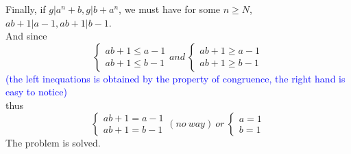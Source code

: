 \documentclass{Math_Note}
\begin{document}
\begin{sol}
Finally, if $g\vert a^{n}+b, g\vert b+a^{n}$, we must have for some $n\geq N$, $ab+1\vert a-1, ab+1\vert b-1$.\\
And since 
\begin{equation}
    \begin{cases}
        ab+1 \leq a-1 \\
        ab+1 \leq b-1 
    \end{cases}
    and\ 
    \begin{cases}
        ab+1 \geq a-1 \\
        ab+1 \geq b-1
    \end{cases}
\end{equation}
\textcolor{blue}{
(the left inequations is obtained by the property of congruence, the right hand is easy to notice)\\
}
thus 
\begin{equation}
    \begin{cases}
        ab+1 = a-1 \\
        ab+1 = b-1 
    \end{cases}
    \left(no\ way\right)\ or\ 
    \begin{cases}
        a=1 \\
        b=1 
    \end{cases}
\end{equation}
The problem is solved.
\end{sol}

\newpage
\end{document}
